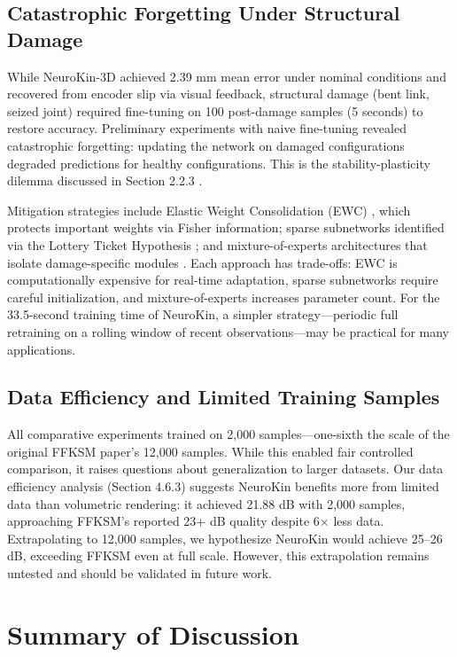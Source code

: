 \documentclass[12pt,a4paper,oneside]{report}
\begin{document}
\subsection{Catastrophic Forgetting Under Structural Damage}

While NeuroKin-3D achieved 2.39 mm mean error under nominal conditions and recovered from encoder slip via visual feedback, structural damage (bent link, seized joint) required fine-tuning on 100 post-damage samples (5 seconds) to restore accuracy. Preliminary experiments with naive fine-tuning revealed catastrophic forgetting: updating the network on damaged configurations degraded predictions for healthy configurations. This is the stability-plasticity dilemma discussed in Section 2.2.3 \cite{grossberg1987competitive, mermillod2013stability}.

Mitigation strategies include Elastic Weight Consolidation (EWC) \cite{kirkpatrick2017overcoming}, which protects important weights via Fisher information; sparse subnetworks identified via the Lottery Ticket Hypothesis \cite{frankle2018lottery}; and mixture-of-experts architectures that isolate damage-specific modules \cite{mocanu2018scalable}. Each approach has trade-offs: EWC is computationally expensive for real-time adaptation, sparse subnetworks require careful initialization, and mixture-of-experts increases parameter count. For the 33.5-second training time of NeuroKin, a simpler strategy—periodic full retraining on a rolling window of recent observations—may be practical for many applications.

\subsection{Data Efficiency and Limited Training Samples}

All comparative experiments trained on 2,000 samples—one-sixth the scale of the original FFKSM paper's 12,000 samples. While this enabled fair controlled comparison, it raises questions about generalization to larger datasets. Our data efficiency analysis (Section 4.6.3) suggests NeuroKin benefits more from limited data than volumetric rendering: it achieved 21.88 dB with 2,000 samples, approaching FFKSM's reported 23+ dB quality despite 6× less data. Extrapolating to 12,000 samples, we hypothesize NeuroKin would achieve 25–26 dB, exceeding FFKSM even at full scale. However, this extrapolation remains untested and should be validated in future work.

\section{Summary of Discussion}
\end{document}
